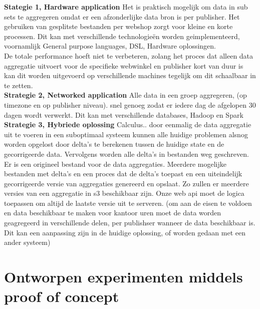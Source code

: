     

\textbf{Stategie 1, Hardware application} 
Het is praktisch mogelijk om data in sub sets te aggregeren omdat er een afzonderlijke data bron is per publisher. 
Het gebruiken van gesplitste bestanden per webshop zorgt voor kleine  en korte processen. Dit kan met verschillende technologieën worden geimplementeerd, voornamlijk General purpose languages, DSL, Hardware oplossingen. \\

De totale performance hoeft niet te verbeteren, zolang het proces dat alleen data aggregatie uitvoert voor de specifieke webwinkel en publisher kort van duur is kan dit worden uitgevoerd op verschillende machines tegelijk om dit schaalbaar in te zetten. \\
    
\textbf{Strategie 2, Networked application}
Alle data in een groep aggregeren, (op timezone en op publisher niveau). snel genoeg zodat er iedere dag de afgelopen 30 dagen wordt verwerkt.
Dit kan met verschillende databases, Hadoop en Spark \\

\textbf{Strategie 3, Hybriede oplossing} Calculus..
door eenmalig de data aggregatie uit te voeren in een suboptimaal systeem kunnen alle huidige problemen alsnog worden opgelost door delta's te berekenen tussen de huidige state en de gecorrigeerde data. Vervolgens worden alle delta's in bestanden weg geschreven. \\

Er is een origineel bestand voor de data aggregaties. Meerdere mogelijke bestanden met delta's en een proces dat de delta's toepast en een uiteindelijk gecorrigeerde versie van aggregaties genereerd en opslaat. 
Zo zullen er meerdere versies van een aggregatie in s3 beschikbaar zijn. Onze web api moet de logica toepassen om altijd de laatste versie uit te serveren. 
(om aan de eisen te voldoen en data beschikbaar te maken voor kantoor uren moet de data worden geagregeerd in verschillende delen, per publishser wanneer de data beschikbaar is. Dit kan een aanpassing zijn in de huidige oplossing, of worden gedaan met een ander systeem)


\clearpage


\section{Ontworpen experimenten middels proof of concept}
\label{sec:deelvraag4}

